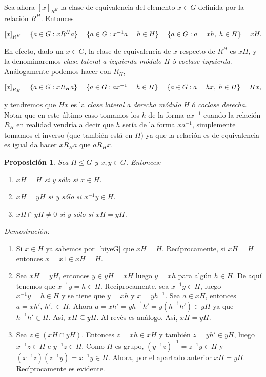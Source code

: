 \documentclass[12pt]{article}
\newtheorem{proposition}[theorem]{Proposición}
\begin{document}
Sea ahora $\left[ x \right]_{R^{H}}$ la clase de equivalencia del elemento $x \in G$ definida por la relación $R^{H}$. Entonces \begin{center}$\left[ x \right]_{R^{H}} = \lbrace a \in G : xR^{H}a \rbrace = \lbrace a \in G : x^{-1}a = h \in H \rbrace = \lbrace a \in G: a = xh, \hspace{0.1cm} h \in H \rbrace = xH.$\end{center}
En efecto, dado un $x \in G$, la clase de equivalencia de $x$ respecto de $R^{H}$ es $xH$, y la denominaremos \textit{clase lateral a izquierda módulo $H$} ó \textit{coclase izquierda}. Análogamente podemos hacer con $R_{H}$, \begin{center}$\left[ x \right]_{R_{H}} = \lbrace a \in G : xR_{H}a \rbrace = \lbrace a \in G: ax^{-1} = h \in H \rbrace = \lbrace a \in G : a = hx, \hspace{0.1cm} h \in H \rbrace = Hx,$\end{center} y tendremos que $Hx$ es la \textit{clase lateral a derecha módulo $H$} ó \textit{coclase derecha}. Notar que en este último caso tomamos los $h$ de la forma $ax^{-1}$ cuando la relación $R_{H}$ en realidad vendría a decir que $h$ sería de la forma $xa^{-1}$, simplemente tomamos el inverso (que también está en $H$) ya que la relación es de equivalencia es igual da hacer $x R_{H}a$ que $aR_{H}x$.

\begin{proposition} Sea $H \leq G$ y $x,y \in G$. Entonces: \begin{enumerate}
\item $xH = H$ si y sólo si $x \in H$.
\item $xH = yH$ si y sólo si $x^{-1}y \in H$.
\item $xH \cap yH \neq 0$ si y sólo si $xH = yH$.
\end{enumerate}
\end{proposition}
\emph{Demostración: }\begin{enumerate}
\item Si $x \in H$ ya sabemos por~\ref{biyeG} que $xH = H$. Recíprocamente, si $xH = H$ entonces $x = x1 \in xH = H$.
\item Sea $xH = yH$, entonces $y \in yH = xH$ luego $y = xh$ para algún $h \in H$. De aquí tenemos que $x^{-1}y = h \in H$. Recíprocamente, sea $x^{-1}y \in H$, luego $x^{-1}y = h \in H$ y se tiene que $y = xh$ y $x = yh^{-1}$. Sea $a \in xH$, entonces $a = xh'$, $h' ,\in H$. Ahora $a = xh' = yh^{-1}h' = y(h^{-1}h') \in yH$ ya que $h^{-1}h' \in H$. Así, $xH \subseteq yH$. Al revés es análogo. Así, $xH = yH$.
\item Sea $z \in (xH \cap yH)$. Entonces $z = xh \in xH$ y también $z= yh' \in yH$, luego $x^{-1}z \in H$ e $y^{-1}z \in H$. Como $H$ es grupo, $(y^{-1}z)^{-1} = z^{-1}y \in H$ y $(x^{-1}z)(z^{-1}y) = x^{-1}y \in H$. Ahora, por el apartado anterior $xH = yH$. Recíprocamente es evidente.

\end{enumerate}
\end{document}
